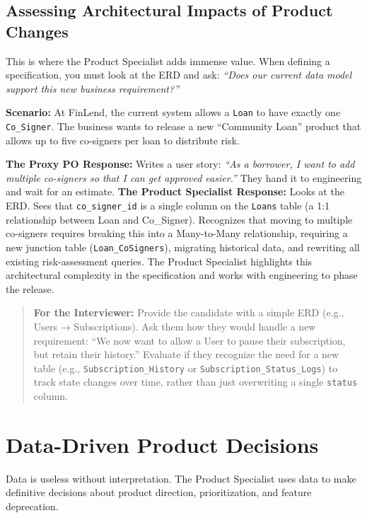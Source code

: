 \subsection{Assessing Architectural Impacts of Product
Changes}\label{assessing-architectural-impacts-of-product-changes}

This is where the Product Specialist adds immense value. When defining a
specification, you must look at the ERD and ask: \emph{``Does our
current data model support this new business requirement?''}

\textbf{Scenario:} At FinLend, the current system allows a \texttt{Loan}
to have exactly one \texttt{Co\_Signer}. The business wants to release a
new ``Community Loan'' product that allows up to five co-signers per
loan to distribute risk.

\textbf{The Proxy PO Response:} Writes a user story: \emph{``As a
borrower, I want to add multiple co-signers so that I can get approved
easier.''} They hand it to engineering and wait for an estimate.
\textbf{The Product Specialist Response:} Looks at the ERD. Sees that
\texttt{co\_signer\_id} is a single column on the \texttt{Loans} table
(a 1:1 relationship between Loan and Co\_Signer). Recognizes that moving
to multiple co-signers requires breaking this into a Many-to-Many
relationship, requiring a new junction table (\texttt{Loan\_CoSigners}),
migrating historical data, and rewriting all existing risk-assessment
queries. The Product Specialist highlights this architectural complexity
in the specification and works with engineering to phase the release.

\begin{quote}
\textbf{For the Interviewer:} Provide the candidate with a simple ERD
(e.g., Users → Subscriptions). Ask them how they would handle a new
requirement: ``We now want to allow a User to pause their subscription,
but retain their history.'' Evaluate if they recognize the need for a
new table (e.g., \texttt{Subscription\_History} or
\texttt{Subscription\_Status\_Logs}) to track state changes over time,
rather than just overwriting a single \texttt{status} column.
\end{quote}

\bigskip

\section{Data-Driven Product
Decisions}\label{data-driven-product-decisions}

Data is useless without interpretation. The Product Specialist uses data
to make definitive decisions about product direction, prioritization,
and feature deprecation.

